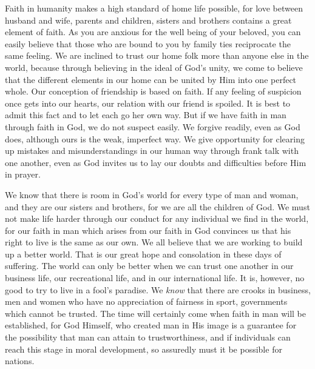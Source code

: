 Faith in humanity makes a high standard of home life
possible, for love between husband and wife, parents and
children, sisters and brothers contains a great element of
faith. As you are anxious for the well being of your
beloved, you can easily believe that those who are bound to
you by family ties reciprocate the same feeling. We are
inclined to trust our home folk more than anyone else in
the world, because through believing in the ideal of God's
unity, we come to believe that the different elements in
our home can be united by Him into one perfect whole. Our
conception of friendship is based on faith. If any feeling
of suspicion once gets into our hearts, our relation with
our friend is spoiled. It is best to admit this fact and
to let each go her own way. But if we have faith in man
through faith in God, we do not suspect easily. We forgive
readily, even as God does, although ours is the weak,
imperfect way. We give opportunity for clearing up
mistakes and misunderstandings in our human way through
frank talk with one another, even as God invites us to lay
our doubts and difficulties before Him in prayer.

We know that there is room in God's world for every
type of man and woman, and they are our sisters and
brothers, for we are all the children of God. We must not
make life harder through our conduct for any individual we
find in the world, for our faith in man which arises from
our faith in God convinces us that his right to live is the
same as our own. We all believe that we are working to
build up a better world. That is our great hope and consolation
in these days of suffering. The world can only be
better when we can trust one another in our business life,
our recreational life, and in our international life. It
is, however, no good to try to live in a fool's paradise.
We \textsl{know} that there are crooks in business, men and women
who have no appreciation of fairness in sport, governments
which cannot be trusted. The time will certainly come when
faith in man will be established, for God Himself, who
created man in His image is a guarantee for the possibility
that man can attain to trustworthiness, and if individuals
can reach this stage in moral development, so assuredly
must it be possible for nations.

